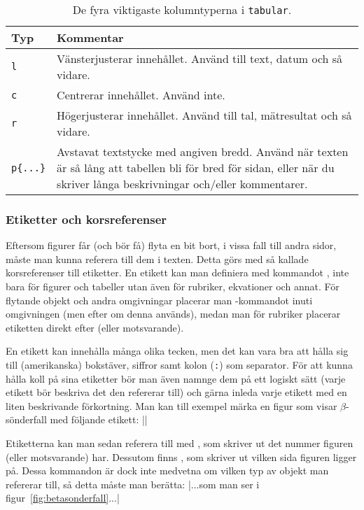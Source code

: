 \documentclass[lang=sv,ptsize=10pt,font=none,nomath,titles=bf,../../a4.tex]{subfiles}
\begin{document}
\begin{table}[tbp]
	\centering 
	\caption{De fyra viktigaste kolumntyperna i \texttt{tabular}.}
	\label{tab:kolumner}
	\begin{tabular}{l p{}}
		\toprule 
		Typ & Kommentar \\
		\midrule 
		\texttt{l} & Vänsterjusterar innehållet. Använd till text, datum
					 och så vidare. \\
		\texttt{c} & Centrerar innehållet. Använd inte. \\
		\texttt{r} & Högerjusterar innehållet. Använd till tal, 
				     mätresultat och så vidare. \\
		\texttt{p\{...\}} & Avstavat textstycke med angiven bredd. Använd
							när texten är så lång att tabellen bli för
							bred för sidan, eller när du skriver långa
							beskrivningar och/eller kommentarer. \\
		\bottomrule 
	\end{tabular}
\end{table}

\subsubsection{Etiketter och korsreferenser}\label{sec:labels}
Eftersom figurer får (och bör få) flyta en bit bort, i vissa fall till 
andra sidor, måste man kunna referera till dem i texten. Detta görs med så
kallade korsreferenser till etiketter. En etikett kan man definiera med
kommandot , inte bara för figurer och tabeller utan även för
rubriker, ekvationer och annat. För flytande objekt och andra omgivningar
placerar man -kommandot inuti omgivningen (men efter 
 om denna används), medan man för rubriker placerar etiketten
direkt efter  (eller motsvarande).

En etikett kan innehålla många olika tecken, men det kan vara bra att
hålla sig till (amerikanska) bokstäver, siffror samt kolon (\texttt{:}) 
som separator.
För att kunna hålla koll på sina etiketter bör man även namnge dem på ett
logiskt sätt (varje etikett bör beskriva det den refererar till) och gärna
inleda varje etikett med en liten beskrivande förkortning. Man kan till
exempel märka en figur som visar \(\beta\)-sönderfall med följande etikett:
\latex|\label{fig:betasonderfall}|

Etiketterna kan man sedan referera till med , som skriver ut det
nummer figuren (eller motsvarande) har. Dessutom finns , som
skriver ut vilken sida figuren ligger på. Dessa kommandon är dock inte
medvetna om vilken typ av objekt man refererar till, så detta måste man
berätta:
\latex|...som man ser i figur~\ref{fig:betasonderfall}...|
\end{document}
